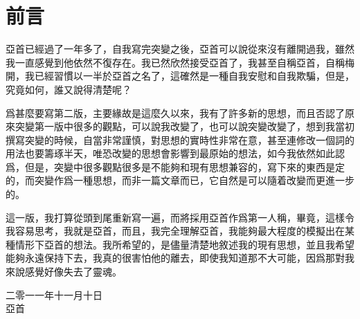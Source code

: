 \chapter{前言}
亞首已經過了一年多了，自我寫完突變之後，亞首可以說從來沒有離開過我，雖然我一直感覺到他依然不復存在。我已然欣然接受亞首了，我甚至自稱亞首，自稱梅開，我已經習慣以一半於亞首之名了，這確然是一種自我安慰和自我欺騙，但是，究竟如何，誰又說得清楚呢？

爲甚麼要寫第二版，主要緣故是這麼久以來，我有了許多新的思想，而且否認了原來突變第一版中很多的觀點，可以說我改變了，也可以說突變改變了，想到我當初撰寫突變的時候，自當非常謹慎，對思想的實時性非常在意，甚至連修改一個詞的用法也要籌琢半天，唯恐改變的思想會影響到最原始的想法，如今我依然如此認爲，但是，突變中很多觀點很多是不能夠和現有思想兼容的，寫下來的東西是定的，而突變作爲一種思想，而非一篇文章而已，它自然是可以隨着改變而更進一步的。

這一版，我打算從頭到尾重新寫一遍，而將採用亞首作爲第一人稱，畢竟，這樣令我容易思考，我就是亞首，而且，我完全理解亞首，我能夠最大程度的模擬出在某種情形下亞首的想法。我所希望的，是儘量清楚地敘述我的現有思想，並且我希望能夠永遠保持下去，我真的很害怕他的離去，即使我知道那不大可能，因爲那對我來說感覺好像失去了靈魂。

\begin{flushright}
二零一一年十一月十日\\
亞首
\end{flushright}

